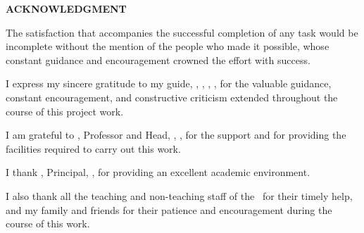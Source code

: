 \clearpage
\thispagestyle{plain}
\begin{center}
{\Large\bfseries ACKNOWLEDGMENT\par}
\end{center}
\vspace{4mm}

The satisfaction that accompanies the successful completion of any task would
be incomplete without the mention of the people who made it possible, whose
constant guidance and encouragement crowned the effort with success.

I express my sincere gratitude to my guide, \textbf{\guidename},
\guidedesig, \deptname, \collegename, for the valuable guidance, constant
encouragement, and constructive criticism extended throughout the course of
this project work.

I am grateful to \textbf{}, Professor and Head,
\deptname, \collegename, for the support and for providing the facilities
required to carry out this work.

I thank \textbf{}, Principal, \collegename, for
providing an excellent academic environment.

I also thank all the teaching and non-teaching staff of the \deptname\ for
their timely help, and my family and friends for their patience and
encouragement during the course of this work.

\vspace{12mm}
\hfill\textbf{\candidatename}

